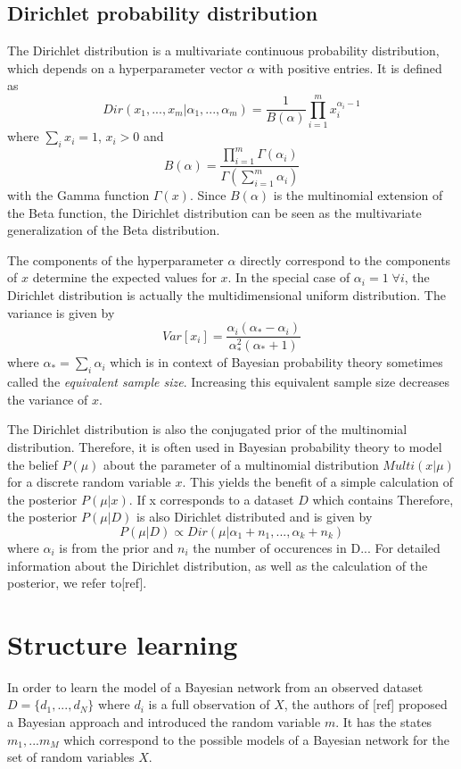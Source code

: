 \documentclass{article}
\begin{document}
	\subsection{Dirichlet probability distribution}
	The Dirichlet distribution is a multivariate continuous probability distribution, which depends on a
	hyperparameter vector $\alpha$ with positive entries. It is defined as
	\[
		Dir(x_1,...,x_m|\alpha_1, ..., \alpha_{m})=\frac{1}{B(\alpha)}\prod_{i=1}^m x_i^{\alpha_i -1}
	\]
	where $\sum_i x_i = 1$, $x_i>0$ and 
	\[
		B(\alpha)=\frac{\prod_{i=1}^m\Gamma(\alpha_i)}{\Gamma(\sum_{i=1}^m \alpha_i)}
	\]
	with the Gamma function $\Gamma(x)$. Since $B(\alpha)$ is the multinomial extension of the Beta function,
	the Dirichlet distribution can be seen as the	multivariate generalization of the Beta distribution.
	
	The components of the hyperparameter $\alpha$ directly correspond to the components of $x$ determine
	the expected values for $x$. In the special case of $\alpha_i = 1 \; \forall i$, the Dirichlet distribution
	is actually the multidimensional uniform distribution. The variance is given by
	\[
		Var[x_i] = \frac{\alpha_i(\alpha_*-\alpha_i)}{\alpha_*^2(\alpha_* + 1)}
	\]
	where $\alpha_* = \sum_i \alpha_i$ which is in context of Bayesian probability theory sometimes
	called the \textit{equivalent sample size}. Increasing this equivalent sample size decreases the
	variance of $x$.
	
	The Dirichlet distribution is also the conjugated prior of the multinomial distribution.
	Therefore, it is often used in Bayesian probability theory to model the belief $P(\mu)$ about the
	parameter of a multinomial distribution $Multi(x|\mu)$ for a discrete random variable $x$.
	This yields the benefit of a simple calculation of the posterior $P(\mu|x)$. If x corresponds to
	a dataset $D$ which contains
	Therefore, the posterior $P(\mu|D)$ is also Dirichlet distributed and is given by
	\[
		P(\mu|D) \propto Dir(\mu|\alpha_1+n_1, ..., \alpha_k+n_k)
	\]	
	where $\alpha_i$ is from the prior and $n_i$ the number of occurences in D...
	For detailed information about the Dirichlet distribution, as well as the calculation of the
	posterior, we refer to[ref].

\section{Structure learning}
	In order to learn the model of a Bayesian network 
	from an observed dataset $D=\{d_1,...,d_N\}$ where $d_i$ is a full observation of $X$,
	the authors of [ref]	proposed a Bayesian approach 
	and introduced the random variable $m$. It has the states $m_1,...m_M$ which correspond to the 
	possible models of a Bayesian network for the set of random variables $X$.
	
\end{document}
